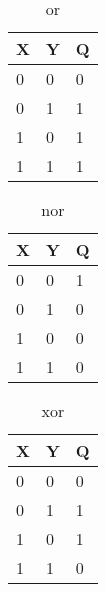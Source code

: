 \documentclass[a4paper]{article}
\begin{document}
\begin{table}[h]
\centering\caption{or}
\begin{tabular}{|l|l|l|}
\hline
X&Y&Q \\
\hline
0&0&0\\
\hline
0&1&1 \\
\hline
1&0&1 \\
\hline
1&1&1 \\
\hline


\end{tabular}
\end{table}
\begin{table}[h]
\centering\caption{nor}
\begin{tabular}{|l|l|l|}
\hline
X&Y&Q \\
\hline
0&0&1\\
\hline
0&1&0 \\
\hline
1&0&0 \\
\hline
1&1&0 \\
\hline


\end{tabular}
\end{table}
\begin{table}[h]
\centering\caption{xor}
\begin{tabular}{|l|l|l|}
\hline
X&Y&Q \\
\hline
0&0&0\\
\hline
0&1&1 \\
\hline
1&0&1 \\
\hline
1&1&0 \\
\hline


\end{tabular}
\end{table}
\end{document}
